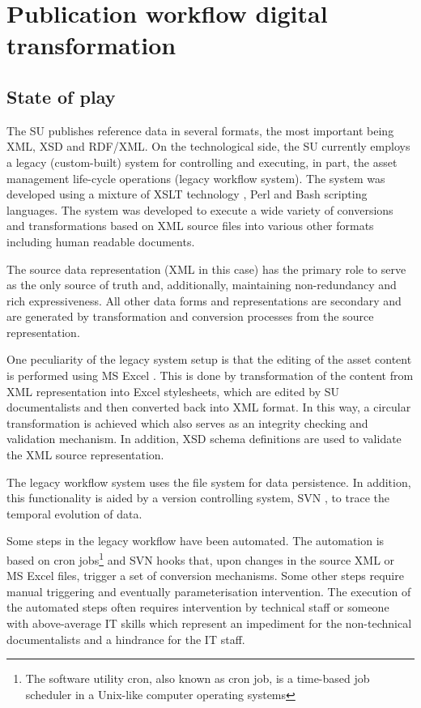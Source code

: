 \section{Publication workflow digital transformation}
\label{sec:context}


	\subsection{State of play}
	The SU publishes reference data in several formats, the most important being XML, XSD and RDF/XML. On the technological side, the SU currently employs a legacy (custom-built) system for controlling and executing, in part, the asset management life-cycle operations (legacy workflow system). The system was developed using a mixture of XSLT technology \cite{xslt3-Kay}, Perl and Bash scripting languages. The system was developed to execute a wide variety of conversions and transformations based on XML source files into various other formats including human readable documents.
	 
	The source data representation (XML in this case) has the primary role to serve as the only source of truth and, additionally, maintaining non-redundancy and rich expressiveness. All other data forms and representations are secondary and are generated by transformation and conversion processes from the source representation.
	 
	One peculiarity of the legacy system setup is that the editing of the asset content is performed using MS Excel \citep{excel}. This is done by transformation of the content from XML representation into Excel stylesheets, which are edited by SU documentalists and then converted back into XML format. In this way, a circular transformation is achieved which also serves as an integrity checking and validation mechanism. In addition, XSD schema definitions are used to validate the XML source representation.
	 
	The legacy workflow system uses the file system for data persistence. In addition, this functionality is aided by a version controlling system, SVN \cite{svn}, to trace the temporal evolution of data.
	 
	Some steps in the legacy workflow have been automated. The automation is based on cron jobs\footnote{The software utility cron, also known as cron job, is a time-based job scheduler in a Unix-like computer operating systems} and SVN hooks that, upon changes in the source XML or MS Excel files, trigger a set of conversion mechanisms.  Some other steps require manual triggering and eventually parameterisation intervention. The execution of the automated steps often requires intervention by technical staff or someone with above-average IT skills which represent an impediment for the non-technical documentalists and a hindrance for the IT staff.
	 

